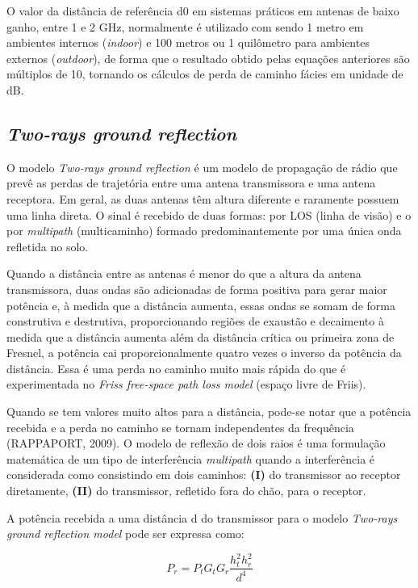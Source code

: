 \documentclass[
	12pt,				%
	openright,			%
	twoside,			%
	a4paper,			%
	english,			%
	french,				%
	spanish,			%
	brazil				%
	]{abntex2}
\begin{document}
O valor da distância de referência d0 em sistemas práticos em antenas de baixo ganho, entre 1 e 2 GHz, normalmente é utilizado com sendo 1 metro em ambientes internos (\textit{indoor}) e 100 metros ou 1 quilômetro para ambientes externos (\textit{outdoor}), de forma que o resultado obtido pelas equações anteriores são múltiplos de 10, tornando os cálculos de perda de caminho fácies em unidade de dB.

\subsection[Two-rays ground reflection]{\textit{Two-rays ground reflection}}

O modelo \textit{Two-rays ground reflection} é um modelo de propagação de rádio que prevê as perdas de trajetória entre uma antena transmissora e uma antena receptora. Em geral, as duas antenas têm altura diferente e raramente possuem uma linha direta. O sinal é recebido de duas formas: por LOS (linha de visão) e o por \textit{multipath} (multicaminho) formado predominantemente por uma única onda refletida no solo.

Quando a distância entre as antenas é menor do que a altura da antena transmissora, duas ondas são adicionadas de forma positiva para gerar maior potência e, à medida que a distância aumenta, essas ondas se somam de forma construtiva e destrutiva, proporcionando regiões de exaustão e decaimento à medida que a distância aumenta além da distância crítica ou primeira zona de Fresnel, a potência cai proporcionalmente quatro vezes o inverso da potência da distância. Essa é uma perda no caminho muito mais rápida do que é experimentada no \textit{Friss free-space path loss model} (espaço livre de Friis).

Quando se tem valores muito altos para a distância, pode-se notar que a potência recebida e a perda no caminho se tornam independentes da frequência (RAPPAPORT, 2009). O modelo de reflexão de dois raios é uma formulação matemática de um tipo de interferência \textit{multipath} quando a interferência é considerada como consistindo em dois caminhos: \textbf{(I)} do transmissor ao receptor diretamente, \textbf{(II)} do transmissor, refletido fora do chão, para o receptor.

A potência recebida a uma distância d do transmissor para o modelo \textit{Two-rays ground reflection model} pode ser expressa como:


\begin{equation}
P_{r} = P_{t}G_{t}G_{r}\frac{h^{2}_{t}h^{2}_{r}}{d^{4}}
\end{equation}
\end{document}
